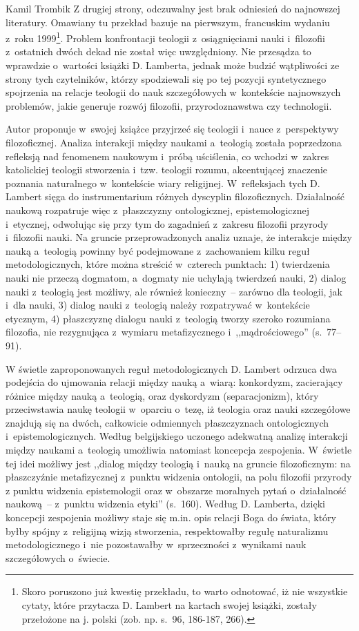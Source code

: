\begin{recplenv}{Kamil Trombik}
Z drugiej strony, odczuwalny jest brak odniesień do najnowszej literatury. Omawiany tu przekład bazuje na pierwszym,
francuskim wydaniu z~roku 1999\footnote{Skoro poruszono już kwestię przekładu, to warto odnotować, iż nie wszystkie
cytaty, które przytacza D. Lambert na kartach swojej książki, zostały przełożone na j. polski (zob. np. s.~96, 186-187,
266). }. Problem konfrontacji teologii z~osiągnięciami nauki i~filozofii z~ostatnich dwóch dekad nie został więc
uwzględniony. Nie przesądza to wprawdzie o~wartości książki D. Lamberta, jednak może budzić wątpliwości ze strony tych
czytelników, którzy spodziewali się po tej pozycji syntetycznego spojrzenia na relacje teologii do nauk
szczegółowych w~kontekście najnowszych problemów, jakie generuje rozwój filozofii, przyrodoznawstwa czy technologii. 

Autor proponuje w~swojej książce przyjrzeć się teologii i~nauce z~perspektywy filozoficznej. Analiza interakcji między
naukami a~teologią została poprzedzona refleksją nad fenomenem naukowym i~próbą uściślenia, co wchodzi w~zakres
katolickiej teologii stworzenia i~tzw. teologii rozumu, akcentującej znaczenie poznania naturalnego w~kontekście wiary
religijnej. W~refleksjach tych D. Lambert sięga do instrumentarium różnych dyscyplin filozoficznych. Działalność
naukową rozpatruje więc z~płaszczyzny ontologicznej, epistemologicznej i~etycznej, odwołując się przy tym do
zagadnień z~zakresu filozofii przyrody i~filozofii nauki. Na gruncie przeprowadzonych analiz uznaje, że interakcje między
nauką a~teologią powinny być podejmowane z~zachowaniem kilku reguł metodologicznych, które można streścić w~czterech punktach:
1) twierdzenia nauki nie przeczą dogmatom, a~dogmaty nie uchylają twierdzeń nauki, 2) dialog nauki z~teologią jest
możliwy, ale również konieczny~-- zarówno dla teologii, jak i~dla nauki, 3) dialog nauki z~teologią należy
rozpatrywać w~kontekście etycznym, 4) płaszczyznę dialogu nauki z~teologią tworzy szeroko rozumiana filozofia,
nie rezygnująca z~wymiaru metafizycznego i~,,mądrościowego'' (s.~77–91).

W świetle zaproponowanych reguł metodologicznych D. Lambert odrzuca dwa podejścia do ujmowania relacji między
nauką a~wiarą: konkordyzm, zacierający różnice między nauką a~teologią, oraz dyskordyzm (separacjonizm), który przeciwstawia
naukę teologii w~oparciu o~tezę, iż teologia oraz nauki szczegółowe znajdują się na dwóch, całkowicie odmiennych
płaszczyznach ontologicznych i~epistemologicznych. Według belgijskiego uczonego adekwatną analizę interakcji między
naukami a~teologią umożliwia natomiast koncepcja zespojenia. W~świetle tej idei możliwy jest ,,dialog między
teologią i~nauką na gruncie filozoficznym: na płaszczyźnie metafizycznej z~punktu widzenia ontologii, na polu filozofii przyrody z
punktu widzenia epistemologii oraz w~obszarze moralnych pytań o~działalność naukową~-- z~punktu widzenia etyki''
(s.~160). Według D. Lamberta, dzięki koncepcji zespojenia możliwy staje się m.in. opis relacji Boga do świata, który byłby
spójny z~religijną wizją stworzenia, respektowałby regułę naturalizmu metodologicznego i~nie
pozostawałby w~sprzeczności z~wynikami nauk szczegółowych o~świecie. 


\end{recplenv}
